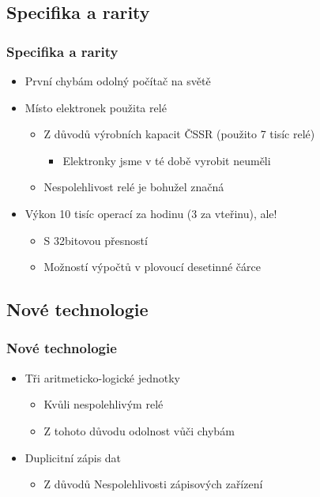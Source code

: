 \documentclass{beamer}
\begin{document}
\subsection{Specifika a rarity}
    \begin{frame}
        \frametitle{Specifika a rarity}
        \begin{itemize}
            \item První chybám odolný počítač na světě
            \item Místo elektronek použita relé
            \begin{itemize}
                \item Z důvodů výrobních kapacit ČSSR (použito 7 tisíc relé)
                    \begin{itemize}
                        \item Elektronky jsme v té době vyrobit neuměli
                    \end{itemize}
                \item Nespolehlivost relé je bohužel značná
            \end{itemize}
            \item Výkon 10 tisíc operací za hodinu (3 za vteřinu), ale!
            \begin{itemize}
                \item S 32bitovou přesností
                \item Možností výpočtů v plovoucí desetinné čárce
            \end{itemize}
        \end{itemize}
    \end{frame}
\subsection{Nové technologie}
    \begin{frame}
        \frametitle{Nové technologie}
        \begin{itemize}
            \item Tři aritmeticko-logické jednotky
                \begin{itemize}
                    \item Kvůli nespolehlivým relé
                    \item Z tohoto důvodu odolnost vůči chybám
                \end{itemize}
            \item Duplicitní zápis dat
                \begin{itemize}
                    \item Z důvodů Nespolehlivosti zápisových zařízení
                \end{itemize}
        \end{itemize}
    \end{frame}
\end{document}
